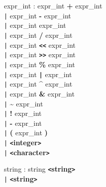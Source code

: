 \begin{tabbing}
\grindent
expr\_int \> : expr\_int {\bf +} expr\_int\\
\> \texttt{|} expr\_int {\bf -} expr\_int\\
\> \texttt{|} expr\_int {\bf *} expr\_int\\
\> \texttt{|} expr\_int {\bf /} expr\_int\\
\> \texttt{|} expr\_int {\bf \texttt{<}\texttt{<}} expr\_int\\
\> \texttt{|} expr\_int {\bf \texttt{>}\texttt{>}} expr\_int\\
\> \texttt{|} expr\_int {\bf \%} expr\_int\\
\> \texttt{|} expr\_int {\bf \texttt{|}} expr\_int\\
\> \texttt{|} expr\_int {\bf \^{ }} expr\_int\\
\> \texttt{|} expr\_int {\bf \&} expr\_int\\
\> \texttt{|} {\bf \~{ }} expr\_int\\
\> \texttt{|} {\bf !} expr\_int\\
\> \texttt{|} {\bf -} expr\_int\\
\> \texttt{|} {\bf (} expr\_int {\bf )}\\
\> \texttt{|} {\bf \texttt{<}integer\texttt{>}}\\
\> \texttt{|} {\bf \texttt{<}character\texttt{>}}
\end{tabbing}

\begin{tabbing}
\grindent
string \> : string {\bf \texttt{<}string\texttt{>}}\\
\> \texttt{|} {\bf \texttt{<}string\texttt{>}}
\end{tabbing}

